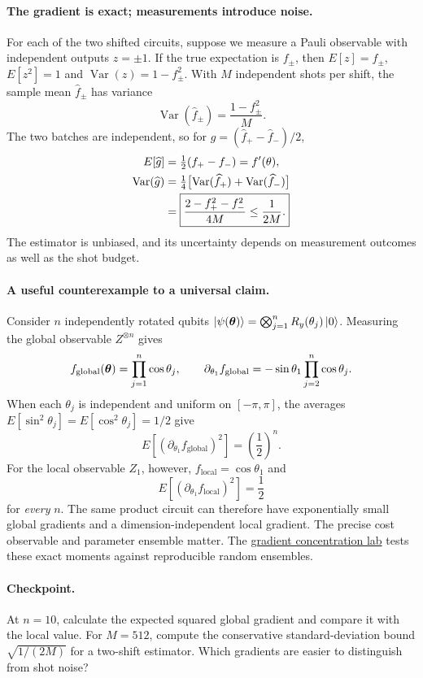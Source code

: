 \paragraph{The gradient is exact; measurements introduce noise.}
For each of the two shifted circuits, suppose we measure
a Pauli observable with independent outputs $z=\pm1$.
If the true expectation is $f_\pm$, then
$E[z]=f_\pm$, $E[z^2]=1$ and
$\operatorname{Var}(z)=1-f_\pm^2$.
With $M$ independent shots per shift,
the sample mean $\widehat f_\pm$ has variance
\begin{equation}
\operatorname{Var}(\widehat f_\pm)
=\frac{1-f_\pm^2}{M}.
\end{equation}
The two batches are independent, so for
$\widehat g=(\widehat f_+-\widehat f_-)/2$,
\begin{align}
E[\widehat g]
&=\tfrac12(f_+-f_-)=f'(\theta),\\
\operatorname{Var}(\widehat g)
&=\tfrac14\bigl[\operatorname{Var}(\widehat f_+)
+\operatorname{Var}(\widehat f_-)\bigr]\notag\\
&=\boxed{\frac{2-f_+^2-f_-^2}{4M}
\leq\frac1{2M}.}
\end{align}
The estimator is unbiased, and its uncertainty depends on
measurement outcomes as well as the shot budget.

\paragraph{A useful counterexample to a universal claim.}
Consider $n$ independently rotated qubits
$\left|\psi(\bm{\theta})\right\rangle=\bigotimes_{j=1}^n
R_y(\theta_j)\left|0\right\rangle$. Measuring the global observable
$Z^{\otimes n}$ gives
\begin{equation}
f_{\mathrm{global}}(\bm{\theta})
=\prod_{j=1}^n\cos\theta_j,\qquad
\partial_{\theta_1}f_{\mathrm{global}}
=-\sin\theta_1\prod_{j=2}^n\cos\theta_j.
\end{equation}
When each $\theta_j$ is independent and uniform
on $[-\pi,\pi]$, the averages
$E[\sin^2\theta_j]=E[\cos^2\theta_j]=1/2$
give
\begin{equation}
E[(\partial_{\theta_1}f_{\mathrm{global}})^2]
=\left(\frac12\right)^n.
\end{equation}
For the local observable $Z_1$, however,
$f_{\mathrm{local}}=\cos\theta_1$ and
\begin{equation}
E[(\partial_{\theta_1}f_{\mathrm{local}})^2]
=\frac12
\end{equation}
for \emph{every} $n$. The same product circuit can
therefore have exponentially small global gradients and
a dimension-independent local gradient. The precise
cost observable and parameter ensemble matter.
The
\href{https://kangqiaoliu.github.io/courses/advanced-quantum-mechanics/companion/labs/IC-09-06/index.html}
{gradient concentration lab} tests these exact moments
against reproducible random ensembles.

\paragraph{Checkpoint.}
At $n=10$, calculate the expected squared global
gradient and compare it with the local value.
For $M=512$, compute the conservative standard-deviation
bound $\sqrt{1/(2M)}$ for a two-shift estimator.
Which gradients are easier to distinguish from shot noise?
